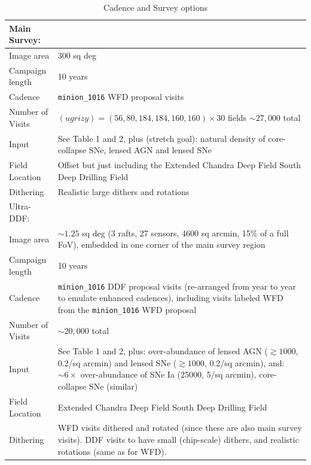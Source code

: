 \documentclass[preprint,times]{aastex61}
\begin{document}
\begin{table}[!htb]
  \centering
  \caption{Cadence and Survey options}
  \label{tab:cadence-options}
  \begin{tabular}{| L{0.2\textwidth}| L{0.75\textwidth}| }
   \hline
    Main Survey:       &  \\
    \hline
    Image area         & 300 sq deg \\
    Campaign length    & 10 years \\ 
    Cadence            & \texttt{minion\_1016} WFD proposal visits \\    
    Number of Visits   & $(ugrizy) = (56, 80,184,184,160,160) \times 30$ fields $\sim 27,000$ total \\
    Input              & See Table 1 and 2, plus (stretch goal): natural density of core-collapse SNe, 
                         lensed AGN and lensed SNe\\
    Field Location     & Offset but just including the Extended Chandra Deep Field South Deep Drilling Field \\
    Dithering          & Realistic large dithers and rotations  \\
    \hline
    Ultra-DDF:         &  \\
    \hline
    Image area         & $\sim1.25$ sq deg (3 rafts, 27 sensors, 4600 sq arcmin, 
                         15\% of a full FoV), embedded in one corner of the main 
                         survey region \\
    Campaign length    & 10 years \\ 
    Cadence            & \texttt{minion\_1016} 
                         DDF proposal visits (re-arranged from year to year to emulate enhanced cadences),
                         including visits labeled WFD from the \texttt{minion\_1016} WFD proposal \\
    Number of Visits   & $\sim 20,000$ total \\
    Input              & See Table 1 and 2, plus: over-abundance of lensed 
                         AGN ($\gtrsim 1000$, 0.2/sq arcmin) and lensed 
                         SNe ($\gtrsim 1000$, 0.2/sq arcmin), and: 
                         $\sim6\times$ over-abundance of SNe Ia (25000, 5/sq arcmin), 
                         core-collapse SNe (similar) \\
    Field Location     & Extended Chandra Deep Field South Deep Drilling Field \\
    Dithering          & WFD visits dithered and rotated (since these are also main survey visits). 
                         DDF visits to have small (chip-scale) dithers, and realistic rotations (same as for WFD).   \\
    \hline
  \end{tabular}
\end{table}
\end{document}
